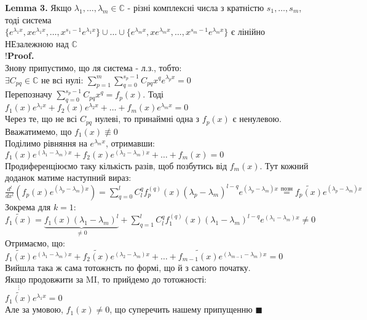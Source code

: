 \documentclass[a4paper, 14pt]{extarticle}
\def\huge{\displaystyle}
\def\lm#1{\textbf{Lemma {#1}}}
\def\proof{\textbf{Proof.}\\}
\def\qed{$\blacksquare$}
\begin{document}
\lm{3.} Якщо $\lambda_1, \dots, \lambda_m \in \mathbb{C}$ - різні комплексні числа з кратністю $s_1, \dots, s_m$, тоді система\\
$\{e^{\lambda_1 x}, x e^{\lambda_1 x}, \dots, x^{s_1-1} e^{\lambda_1 x}\} \cup \dots \cup \{e^{\lambda_m x}, x e^{\lambda_m x}, \dots, x^{s_m-1} e^{\lambda_m x}\}$ є лінійно НЕзалежною над $\mathbb{C}$\\
!\proof
Знову припустимо, що ля система - л.з., тобто:\\
$\exists C_{pq} \in \mathbb{C}$ не всі нулі: $\huge \sum_{p=1}^m \sum_{q=0}^{s_p-1} C_{pq}x^qe^{\lambda_p x} = 0$\\
Перепозначу $\huge \sum_{q=0}^{s_p - 1} C_{pq}x^q = f_p(x)$. Тоді\\
$f_1(x)e^{\lambda_1 x} + f_2(x)e^{\lambda_2 x} + \dots + f_m(x)e^{\lambda_m x} = 0$\\
Через те, що не всі $C_{pq}$ нулеві, то принаймні одна з $f_p(x)$ є ненулевою. Вважатимемо, що $f_1(x) \not\equiv 0$\\
Поділимо рівняння на $e^{\lambda_m x}$, отримавши:\\
$f_1(x)e^{(\lambda_1-\lambda_m) x} + f_2(x)e^{(\lambda_2-\lambda_m) x} + \dots + f_m(x) = 0$\\
Продиференціюємо таку кількість разів, щоб позбутись від $f_m(x)$.
Тут кожний доданок матиме наступний вираз:\\
$\huge \frac{d^l}{dx^l} \left(f_p(x)e^{(\lambda_p - \lambda_m)x} \right) = \sum_{q=0}^l C_l^q f_p^{(q)}(x)(\lambda_p - \lambda_m)^{l-q}e^{(\lambda_p - \lambda_m)x} \overset{\textrm{позн}}{=} \tilde{f_p(x)}e^{(\lambda_p - \lambda_m)x}$\\
Зокрема для $k=1$:\\ $\huge \tilde{f_1(x)} = \underbrace{f_1(x)(\lambda_1 - \lambda_m)^l}_{\neq 0} + \sum_{q=1}^l C_l^q f_1^{(q)}(x)(\lambda_1 - \lambda_m)^{l-q}e^{(\lambda_1 - \lambda_m)x} \neq 0$\\
Отримаємо, що:\\
$\tilde{f_1(x)}e^{(\lambda_1 - \lambda_m)x} + \tilde{f_2(x)}e^{(\lambda_2 - \lambda_m)x} + \dots + \tilde{f_{m-1}(x)}e^{(\lambda_{m-1} - \lambda_m)x} = 0$\\
Вийшла така ж сама тотожнсть по формі, що й з самого початку.\\
Якщо продовжити за MI, то прийдемо до тотожності:\\
$\overset{\vdots}{\tilde{f_1(x)}}e^{\lambda_1 x} = 0$\\
Але за умовою, $f_1(x) \neq 0$, що суперечить нашему припущенню \qed
\end{document}
